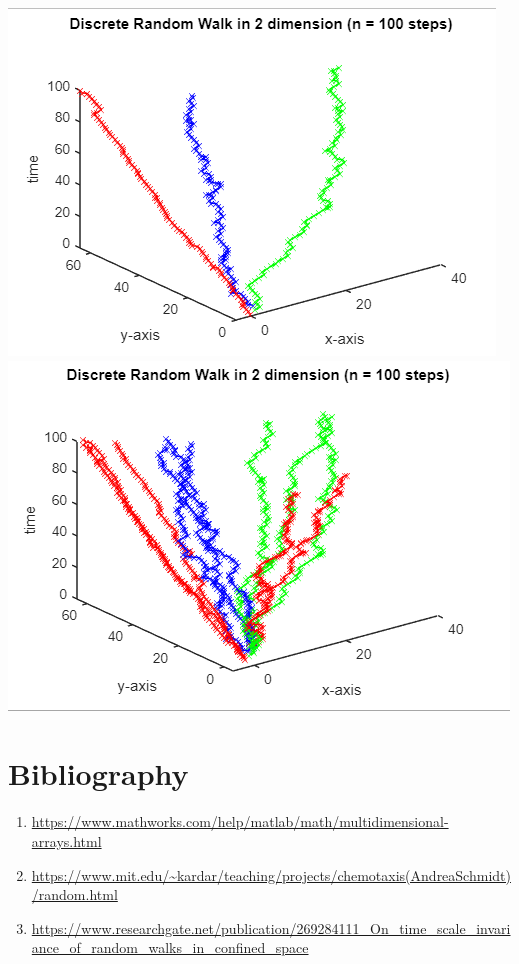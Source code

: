 \documentclass{article}
\begin{document}
\begin{center}
    \begin{multicols}{2}[\columnsep=0.5cm]
        \centering
        \includegraphics[scale=0.4]{rw2d3nodes.PNG}
        \columnbreak
        \includegraphics[scale=0.4]{rw2d4nodes.PNG}
        \end{multicols}

\end{center}
\newpage
\section{Bibliography}

\begin{enumerate}
    \item \url{https://www.mathworks.com/help/matlab/math/multidimensional-arrays.html}
    \item \url{https://www.mit.edu/~kardar/teaching/projects/chemotaxis(AndreaSchmidt)/random.html}
    \item \url{https://www.researchgate.net/publication/269284111_On_time_scale_invariance_of_random_walks_in_confined_space}
\end{enumerate}
\end{document}
